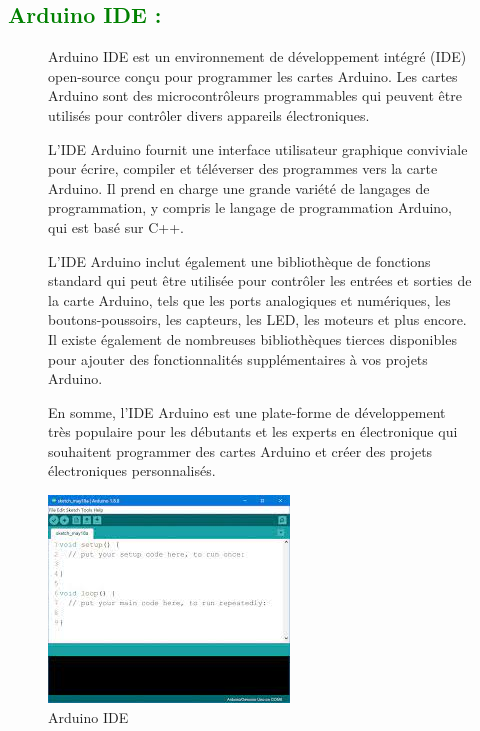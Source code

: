 \begin{flushleft}
	\subsection{\textcolor{green}{Arduino IDE :}}
	\begin{figure}[h]
		\begin{minipage}{0.6\textwidth}
			Arduino IDE est un environnement de développement intégré (IDE) open-source conçu pour programmer les cartes Arduino. Les cartes Arduino sont des microcontrôleurs programmables qui peuvent être utilisés pour contrôler divers appareils électroniques.
			
			L'IDE Arduino fournit une interface utilisateur graphique conviviale pour écrire, compiler et téléverser des programmes vers la carte Arduino. Il prend en charge une grande variété de langages de programmation, y compris le langage de programmation Arduino, qui est basé sur C++.
			
			L'IDE Arduino inclut également une bibliothèque de fonctions standard qui peut être utilisée pour contrôler les entrées et sorties de la carte Arduino, tels que les ports analogiques et numériques, les boutons-poussoirs, les capteurs, les LED, les moteurs et plus encore. Il existe également de nombreuses bibliothèques tierces disponibles pour ajouter des fonctionnalités supplémentaires à vos projets Arduino.
			
			En somme, l'IDE Arduino est une plate-forme de développement très populaire pour les débutants et les experts en électronique qui souhaitent programmer des cartes Arduino et créer des projets électroniques personnalisés.
		\end{minipage}
		\begin{minipage}{0.4\textwidth}
			\centering
			\includegraphics[width=\textwidth]{chapitres/images/aruinoIDE.jpg}
			\caption{Arduino IDE}
			\label{fig:votre_image}
		\end{minipage}
	\end{figure}
	
	\newpage
\end{flushleft}